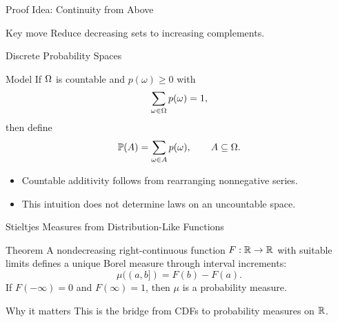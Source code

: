 \begin{frame}{Proof Idea: Continuity from Above}
  \begin{block}{Key move}
    Reduce decreasing sets to increasing complements.
  \end{block}
\end{frame}

\begin{frame}{Discrete Probability Spaces}
  \begin{block}{Model}
    If $\Omega$ is countable and $p(\omega)\ge0$ with
    \[
      \sum_{\omega\in\Omega}p(\omega)=1,
    \]
    then define
    \[
      \mathbb{P}(A)=\sum_{\omega\in A}p(\omega),\qquad A\subseteq\Omega.
    \]
  \end{block}
  \begin{itemize}
    \item Countable additivity follows from rearranging nonnegative series.
    \item This intuition does not determine laws on an uncountable space.
  \end{itemize}
\end{frame}

\begin{frame}{Stieltjes Measures from Distribution-Like Functions}
  \begin{block}{Theorem}
    A nondecreasing right-continuous function $F:\mathbb{R}\to\mathbb{R}$ with suitable limits defines a unique Borel measure through interval increments:
    \[
      \mu((a,b])=F(b)-F(a).
    \]
    If $F(-\infty)=0$ and $F(\infty)=1$, then $\mu$ is a probability measure.
  \end{block}
  \begin{alertblock}{Why it matters}
    This is the bridge from CDFs to probability measures on $\mathbb{R}$.
  \end{alertblock}
\end{frame}

